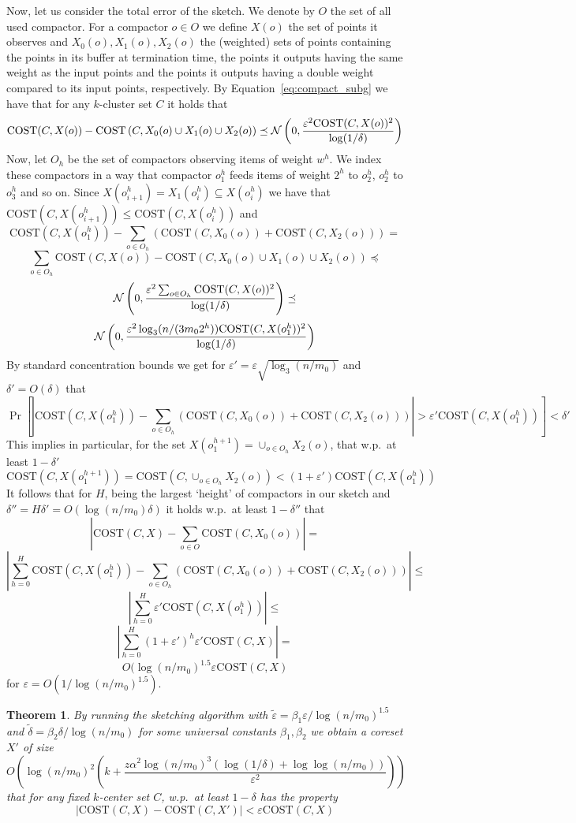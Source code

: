 \documentclass[11pt]{article}
\newtheorem{theorem} {Theorem}
\newcommand{\eps}{\varepsilon}
\newcommand{\cost}{\text{COST}}
\newcommand{\N}{{\cal N}}
\begin{document}
Now, let us consider the total error of the sketch. We denote by $O$ the set of all used compactor. For a compactor $o \in O$ we define $X(o)$ the set of points it observes and $X_0(o), X_1(o), X_2(o)$ the (weighted) sets of points containing the points in its buffer at termination time, the points it outputs having the same weight as the input points and the points it outputs having a double weight compared to its input points, respectively. By Equation~\ref{eq:compact_subg} we have that for any $k$-cluster set $C$ it holds that
$$\cost(C,X(o)) -  \cost\left(C,X_0(o) \cup X_1(o) \cup X_2(o) \right) \preceq \N \left(0,\frac{\eps^2 \cost(C,X(o))^2}{  \log(1/\delta)} \right)$$
Now, let $O_h$ be the set of compactors observing items of weight $w^h$. We index these compactors in a way that compactor $o_1^h$ feeds items of weight $2^h$ to $o_2^h$, $o_2^h$ to $o_3^h$ and so on. Since $X(o^h_{i+1}) = X_1(o^h_i) \subseteq X(o^h_i)$ we have that $\cost(C,X(o^h_{i+1})) \leq \cost(C,X(o^h_i))$ and 
$$\cost(C,X(o^h_1)) - \sum_{o \in O_h} \left( \cost(C,X_0(o)) + \cost(C,X_2(o)) \right) = $$
$$ \sum_{o \in O_h} \cost(C,X(o)) -  \cost\left(C,X_0(o) \cup X_1(o) \cup X_2(o) \right) \preceq $$
$$ \N \left(0,\frac{\eps^2 \sum_{o \in O_h} \cost(C,X(o))^2}{  \log(1/\delta)} \right) \preceq $$
$$ \N \left(0,\frac{\eps^2 \log_3(n/(3m_0 2^h)) \cost(C,X(o^h_1))^2}{  \log(1/\delta)} \right)  $$
By standard concentration bounds we get for $\eps' = \eps \sqrt{\log_3(n/m_0)}$ and $\delta' = O(\delta)$ that
$$\Pr \left[ \left| \cost(C,X(o^h_1)) - \sum_{o \in O_h} \left( \cost(C,X_0(o)) + \cost(C,X_2(o)) \right) \right| >  \eps' \cost(C,X(o^h_1))\right]<\delta' $$
This implies in particular, for the set $X(o^{h+1}_1) = \cup_{o \in O_h}X_2(o)$, that w.p.\ at least $1-\delta'$
$$ \cost(C,X(o_1^{h+1})) = \cost(C,\cup_{o \in O_h}X_2(o)) < (1+\eps') \cost(C,X(o_1^h)) $$
It follows that for $H$, being the largest `height' of compactors in our sketch and $\delta'' = H\delta' = O(\log(n/m_0)\delta)$ it holds w.p.\ at least $1-\delta''$ that
$$ \left| \cost(C,X) - \sum_{o \in O} \cost(C,X_0(o)) \right| =$$
$$ \left| \sum_{h=0}^{H}  \cost(C,X(o^h_1)) - \sum_{o \in O_h} \left( \cost(C,X_0(o)) + \cost(C,X_2(o)) \right) \right| \leq$$
$$ \left| \sum_{h=0}^{H}  \eps' \cost(C,X(o^h_1)) \right| \leq$$
$$ \left| \sum_{h=0}^{H} (1+\eps')^h \eps' \cost(C,X) \right| =$$
$$ O(\log(n/m_0)^{1.5}\eps \cost(C,X) $$
for $\eps = O(1/\log(n/m_0)^{1.5})$.

\begin{theorem}
By running the sketching algorithm with $\tilde{\eps} = \beta_1 \eps/\log(n/m_0)^{1.5}$ and $\tilde{\delta} = \beta_2 \delta / \log(n/m_0)$ for some universal constants $\beta_1,\beta_2$ we obtain a coreset $X'$ of size 
$$ O\left( \log(n/m_0)^2 \left( k+\frac{ z \alpha^2 \log(n/m_0)^3 \left(\log(1/\delta)+\log\log(n/m_0) \right)}{\eps^2} \right) \right) $$
that for any fixed $k$-center set $C$, w.p.\ at least $1-\delta$ has the property 
$$ \left| \cost(C,X) - \cost(C,X') \right| < \eps \cost(C,X)$$
\end{theorem}
\end{document}
